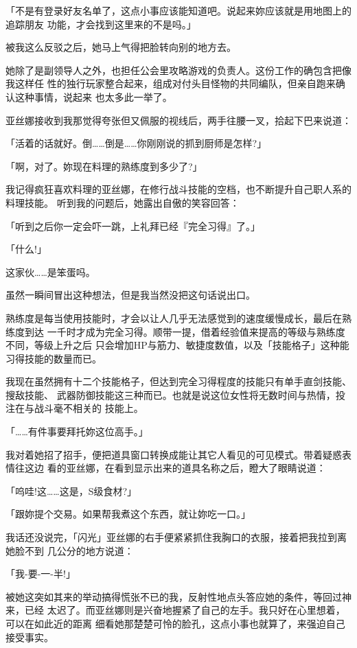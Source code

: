 \documentclass[11pt]{book}
\begin{document}
「不是有登录好友名单了，这点小事应该能知道吧。说起来妳应该就是用地图上的追踪朋友
功能，才会找到这里来的不是吗。」

被我这么反驳之后，她马上气得把脸转向别的地方去。

她除了是副领导人之外，也担任公会里攻略游戏的负责人。这份工作的确包含把像我这样任
性的独行玩家整合起来，组成对付头目怪物的共同编队，但亲自跑来确认这种事情，说起来
也太多此一举了。

亚丝娜接收到我那觉得夸张但又佩服的视线后，两手往腰一叉，拾起下巴来说道：

「活着的话就好。倒……倒是……你刚刚说的抓到厨师是怎样?」

「啊，对了。妳现在料理的熟练度到多少了?」

我记得疯狂喜欢料理的亚丝娜，在修行战斗技能的空档，也不断提升自己职人系的料理技能。
听到我的问题后，她露出自傲的笑容回答：

「听到之后你一定会吓一跳，上礼拜已经『完全习得』了。」

「什么!」

这家伙……是笨蛋吗。

虽然一瞬间冒出这种想法，但是我当然没把这句话说出口。

熟练度是每当使用技能时，才会以让人几乎无法感觉到的速度缓慢成长，最后在熟练度到达
一千时才成为完全习得。顺带一提，借着经验值来提高的等级与熟练度不同，等级上升之后
只会增加HP与筋力、敏捷度数值，以及「技能格子」这种能习得技能的数量而已。

我现在虽然拥有十二个技能格子，但达到完全习得程度的技能只有单手直剑技能、搜敌技能、
武器防御技能这三种而已。也就是说这位女性将无数时间与热情，投注在与战斗毫不相关的
技能上。

「……有件事要拜托妳这位高手。」

我对着她招了招手，便把道具窗口转换成能让其它人看见的可见模式。带着疑惑表情往这边
看的亚丝娜，在看到显示出来的道具名称之后，瞪大了眼睛说道：

「呜哇!这……这是，S级食材?」

「跟妳提个交易。如果帮我煮这个东西，就让妳吃一口。」

我话还没说完，「闪光」亚丝娜的右手便紧紧抓住我胸口的衣服，接着把我拉到离她脸不到
几公分的地方说道：

「我-要-一-半!」





被她这突如其来的举动搞得慌张不已的我，反射性地点头答应她的条件，等回过神来，已经
太迟了。而亚丝娜则是兴奋地握紧了自己的左手。我只好在心里想着，可以在如此近的距离
细看她那楚楚可怜的脸孔，这点小事也就算了，来强迫自己接受事实。
\end{document}
